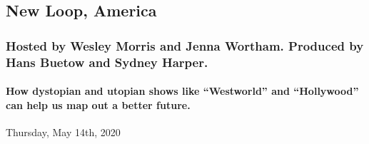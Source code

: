 \hypertarget{new-loop-america-2}{%
\subsection{New Loop, America}\label{new-loop-america-2}}

\hypertarget{hosted-by-wesley-morris-and-jenna-wortham-produced-by-hans-buetow-and-sydney-harper-1}{%
\subsubsection{Hosted by Wesley Morris and Jenna Wortham. Produced by
Hans Buetow and Sydney
Harper.}\label{hosted-by-wesley-morris-and-jenna-wortham-produced-by-hans-buetow-and-sydney-harper-1}}

\hypertarget{how-dystopian-and-utopian-shows-like-westworld-and-hollywood-can-help-us-map-out-a-better-future-2}{%
\paragraph{How dystopian and utopian shows like ``Westworld'' and
``Hollywood'' can help us map out a better
future.}\label{how-dystopian-and-utopian-shows-like-westworld-and-hollywood-can-help-us-map-out-a-better-future-2}}

Thursday, May 14th, 2020

